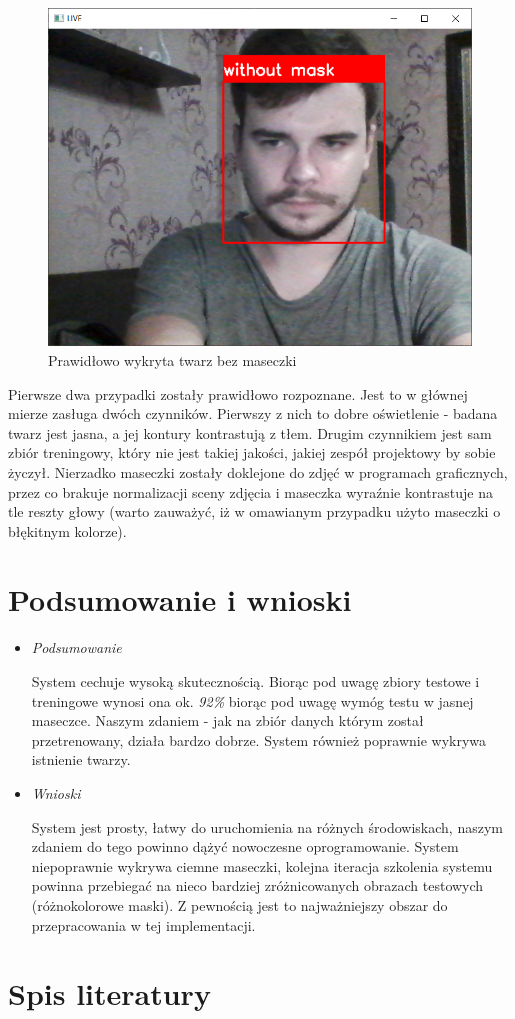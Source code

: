 \documentclass[12pt,a4paper]{article}
\begin{document}
\begin{figure}[h!]
    \centering
    \includegraphics[scale = 0.38]{media/false_bez.png}
    \caption{Prawidłowo wykryta twarz bez maseczki}
    \label{fig:Rysunek2}
\end{figure}
\newpage
Pierwsze dwa przypadki zostały prawidłowo rozpoznane. Jest to w głównej mierze zasługa dwóch czynników. Pierwszy z nich to dobre oświetlenie - badana twarz jest jasna, a jej kontury kontrastują z tłem. Drugim czynnikiem jest sam zbiór treningowy, który nie jest takiej jakości, jakiej zespół projektowy by sobie życzył. Nierzadko maseczki zostały doklejone do zdjęć w programach graficznych, przez co brakuje normalizacji sceny zdjęcia i maseczka wyraźnie kontrastuje na tle reszty głowy (warto zauważyć, iż w omawianym przypadku użyto maseczki o błękitnym kolorze).

\newpage

\section{Podsumowanie i wnioski}

\begin{itemize}
\item \textit{Podsumowanie}

System cechuje wysoką skutecznością. Biorąc pod uwagę zbiory testowe i treningowe wynosi ona ok. \textit{92\%} biorąc pod uwagę wymóg testu w jasnej maseczce. Naszym zdaniem - jak na zbiór danych którym został przetrenowany, działa bardzo dobrze. System również poprawnie wykrywa istnienie twarzy. 

\item \textit{Wnioski}

System jest prosty, łatwy do uruchomienia na różnych środowiskach, naszym zdaniem do tego powinno dążyć nowoczesne oprogramowanie. System niepoprawnie wykrywa ciemne maseczki, kolejna iteracja szkolenia systemu powinna przebiegać na nieco bardziej zróżnicowanych obrazach testowych (różnokolorowe maski). Z pewnością jest to najważniejszy obszar do przepracowania w tej implementacji. 

\end{itemize}

\newpage
\section{Spis literatury}

\printbibliography[heading=none] 
\end{document}
